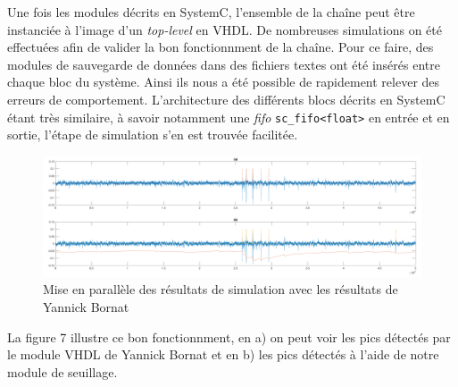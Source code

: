 \documentclass[a4paper,12pt]{article}
\begin{document}
Une fois les modules décrits en SystemC, l'ensemble de la chaîne peut être instanciée à l'image d'un \textit{top-level} en VHDL. De nombreuses simulations on été effectuées afin de valider la bon fonctionnment de la chaîne. Pour ce faire, des modules de sauvegarde de données dans des fichiers textes ont été insérés entre chaque bloc du système. Ainsi ils nous a été possible de rapidement relever des erreurs de comportement. L'architecture des différents blocs décrits en SystemC étant très similaire, à savoir notamment une \textit{fifo} \texttt{sc\_fifo<float>} en entrée et en sortie, l'étape de simulation s'en est trouvée facilitée.

\begin{figure}[H]
\centering
\includegraphics[scale =0.18, keepaspectratio]{results.png}
\caption{Mise en parallèle des résultats de simulation avec les résultats de Yannick Bornat}
\end{figure}
La figure 7 illustre ce bon fonctionnment, en a) on peut voir les pics détectés par le module VHDL de Yannick Bornat et en b) les pics détectés à l'aide de notre module de seuillage.
\end{document}
